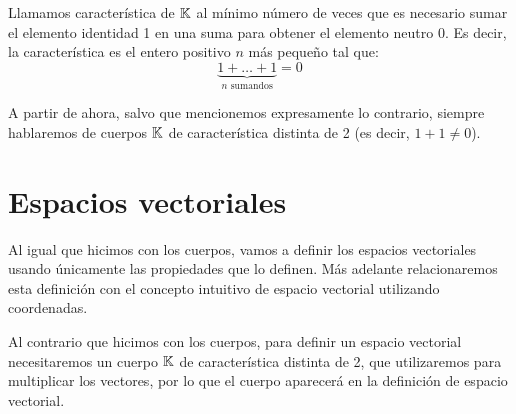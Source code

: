 \documentclass[../ecuaciones_diferenciales.tex]{subfiles}
\begin{document}
\begin{definition}
    Llamamos característica de $\mathbb{K}$ al mínimo número de veces que es necesario sumar el elemento identidad 1 en una suma para obtener el elemento neutro 0. Es decir, la característica es el entero positivo $n$ más pequeño tal que:
    \[
        \underbrace{1+\dots+1}_{n\, \, \mathrm{sumandos}} = 0
    \]  
\end{definition}

A partir de ahora, salvo que mencionemos expresamente lo contrario, siempre hablaremos de cuerpos $\mathbb{K}$ de característica distinta de 2 (es decir, $1+1 \ne 0$).

\section{Espacios vectoriales}

Al igual que hicimos con los cuerpos, vamos a definir los espacios vectoriales usando únicamente las propiedades que lo definen. Más adelante relacionaremos esta definición con el concepto intuitivo de espacio vectorial utilizando coordenadas.

Al contrario que hicimos con los cuerpos, para definir un espacio vectorial necesitaremos un cuerpo $\mathbb{K}$ de característica distinta de 2, que utilizaremos para multiplicar los vectores, por lo que el cuerpo aparecerá en la definición de espacio vectorial.
\end{document}
